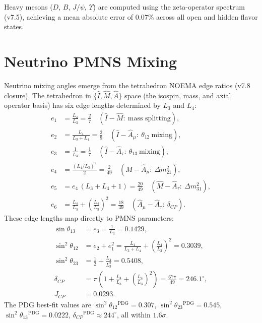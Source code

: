 \documentclass[aps,prd,reprint,twocolumn,showpacs,superscriptaddress]{revtex4-2}
\newcommand{\pdgsup}{\ensuremath{^{\text{PDG}}}}
\begin{document}
Heavy mesons ($D$, $B$, $J/\psi$, $\Upsilon$) are computed using the
zeta-operator spectrum (v7.5), achieving a mean absolute error of
$0.07\%$ across all open and hidden flavor states.

\section{Neutrino PMNS Mixing}
\label{sec:neutrinos}

Neutrino mixing angles emerge from the tetrahedron NOEMA edge ratios
(v7.8 closure).  The tetrahedron in $\{\hat I, \hat M, \hat A\}$ space
(the isospin, mass, and axial operator basis) has six edge lengths
determined by $L_3$ and $L_4$:
\begin{align}
e_1 &= \frac{L_4}{L_3} = \frac{2}{7}
     \quad (\hat I-\hat M:\ \text{mass splitting}), \\
e_2 &= \frac{L_4}{L_3+L_4} = \frac{2}{9}
     \quad (\hat I-\hat A_\mu:\ \theta_{12}\ \text{mixing}), \\
e_3 &= \frac{1}{L_3} = \frac{1}{7}
     \quad (\hat I-\hat A_\tau:\ \theta_{13}\ \text{mixing}), \\
e_4 &= \frac{(L_4/L_3)^2}{2} = \frac{2}{49}
     \quad (\hat M-\hat A_\mu:\ \Delta m_{21}^2), \\
e_5 &= e_4\,(L_3+L_4+1) = \frac{20}{49}
     \quad (\hat M-\hat A_\tau:\ \Delta m_{31}^2), \\
e_6 &= \frac{L_4}{L_3} + \left(\frac{L_4}{L_3}\right)^2 = \frac{18}{49}
     \quad (\hat A_\mu-\hat A_\tau:\ \delta_{CP}).
\end{align}
These edge lengths map directly to PMNS parameters:
\begin{align}
\sin\theta_{13} &= e_3 = \frac{1}{L_3} = 0.1429, \\
\sin^2\theta_{12} &= e_2 + e_1^2
    = \frac{L_4}{L_3+L_4} + \left(\frac{L_4}{L_3}\right)^2 = 0.3039, \\
\sin^2\theta_{23} &= \frac12 + \frac{L_4}{L_3^2} = 0.5408, \\
\delta_{CP} &= \pi\left(1 + \frac{L_4}{L_3} + \left(\frac{L_4}{L_3}\right)^2\right)
    = \frac{67\pi}{49} = 246.1^\circ, \\
J_{CP} &= 0.0293.
\end{align}
The PDG best-fit values are
$\sin^2\theta_{12}\pdgsup=0.307$,
$\sin^2\theta_{23}\pdgsup=0.545$,
$\sin^2\theta_{13}\pdgsup=0.0222$,
$\delta_{CP}\pdgsup\approx244^\circ$,
all within $1.6\sigma$.
\end{document}
